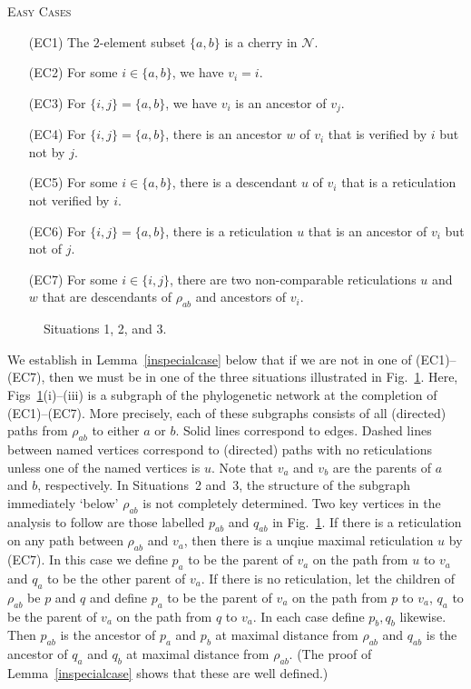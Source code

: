 \documentclass[11pt]{amsart}
\begin{document}
\noindent\textsc{Easy Cases}
\begin{itemize}
\item[(EC1)] The $2$-element subset $\{a, b\}$ is a cherry in ${{\mathcal N}}$.

\item[(EC2)] For some $i\in \{a, b\}$, we have $v_i = i$.

\item[(EC3)] For $\{i, j\}=\{a, b\}$, we have $v_i$ is an ancestor of $v_j$.

\item[(EC4)] For $\{i, j\}=\{a,b\}$, there is an ancestor $w$ of $v_i$ that is verified by $i$ but not by $j$.

\item[(EC5)] For some $i\in \{a,b\}$, there is a descendant $u$ of $v_i$ that is a reticulation not verified by $i$.

\item[(EC6)] For $\{i, j\}=\{a, b\}$, there is a reticulation $u$ that is an ancestor of $v_i$ but not of $j$.

\item[(EC7)] For some $i\in \{i, j\}$, there are two non-comparable reticulations $u$ and $w$ that are descendants of $\rho_{ab}$ and ancestors of $v_i$.
\end{itemize}

\begin{figure}
\center

\caption{Situations 1, 2, and 3.}
\label{situations}
\end{figure}

We establish in Lemma~\ref{inspecialcase} below that if we are not in one of (EC1)--(EC7), then we must be in one of the three situations illustrated in Fig.~\ref{situations}. Here, Figs~\ref{situations}(i)--(iii) is a subgraph of the phylogenetic network at the completion of (EC1)--(EC7). More precisely, each of these subgraphs consists of all (directed) paths from $\rho_{ab}$ to either $a$ or $b$. Solid lines correspond to edges. Dashed lines between named vertices correspond to (directed) paths with no reticulations unless one of the named vertices is $u$. Note that $v_a$ and $v_b$ are the parents of $a$ and $b$, respectively. In Situations~2 and~3, the structure of the subgraph immediately `below' $\rho_{ab}$ is not completely determined. Two key vertices in the analysis to follow are those labelled $p_{ab}$ and $ q_{ab}$ in Fig.~\ref{situations}. If there is a reticulation on any path between $\rho_{ab}$ and $v_a$, then there is a unqiue maximal reticulation $u$ by (EC7). In this case we define $p_a$ to be the parent of $v_a$ on the path from $u$ to $v_a$ and $q_a$ to be the other parent of $v_a$. If there is no reticulation, let the children of $\rho_{ab}$ be $p$ and $q$ and define $p_a$ to be the parent of $v_a$ on the path from $p$ to $v_a$, $q_a$ to be the parent of $v_a$ on the path from $q$ to $v_a$. In each case define $p_b,q_b$ likewise. Then $p_{ab}$ is the ancestor of $p_a$ and $p_b$ at maximal distance from $\rho_{ab}$ and  $q_{ab}$ is the ancestor of $q_a$ and $q_b$ at maximal distance from $\rho_{ab}$. (The proof of Lemma~\ref{inspecialcase}  shows that these are well defined.)  
\end{document}
